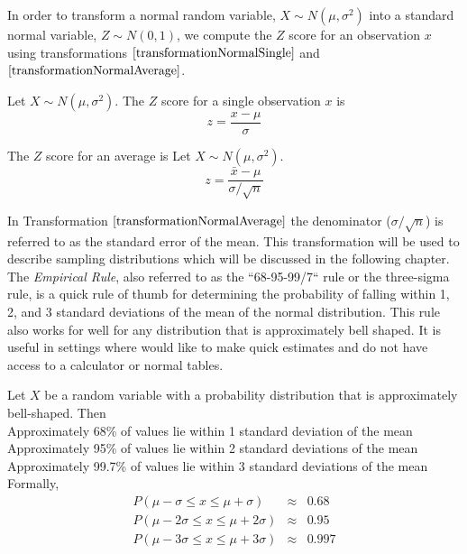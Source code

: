 \noindent
In order to transform a normal random variable, $X \sim N(\mu,\sigma^2)$ 
into a standard normal variable, $Z \sim N(0,1)$, 
we compute the $Z$ score for an observation $x$ using transformations $\ref{transformationNormalSingle}$ and $\ref{transformationNormalAverage}$.

\begin{transformation}
\label{transformationNormalSingle}
Let $X \sim N(\mu, \sigma^{2})$.
The $Z$ score for a single observation $x$ is
	\begin{equation}
	z = \frac{x - \mu}{\sigma}
	\end{equation}
\end{transformation}

\begin{transformation}
\label{transformationNormalAverage}
The $Z$ score for an average is
Let $X \sim N(\mu, \sigma^{2})$.
	\begin{equation}
	z = \frac{ \bar{x} - \mu}{\sigma/\sqrt{n}}
	\end{equation}
\end{transformation}



In Transformation $\ref{transformationNormalAverage}$ 
the denominator ($\sigma/\sqrt{n}$) is referred to as the standard error of the mean. This transformation will be used to describe sampling distributions which will be discussed in the following chapter.\\

The \textit{Empirical Rule}, also referred to as the ``68-95-99/7`` rule or the three-sigma rule, is a quick rule of thumb for 
determining the probability of falling within 1, 2, and 3 standard deviations of the mean of the normal distribution. This rule also works for well for any distribution that is approximately bell shaped. It is useful in settings where would like to make quick estimates and do not have access to a calculator or normal tables.

\begin{rules}	
Let $X$ be a random variable with a probability distribution that is approximately bell-shaped. Then\\

\indent
\quad	Approximately 68\% of values lie within 1 standard deviation of the mean\\[0.25em]
\indent
\quad	Approximately 95\% of values lie within 2 standard deviations of the mean\\[0.25em]
\indent
\quad	Approximately 99.7\% of values lie within 3 standard deviations of the mean\\

Formally,
\begin{eqnarray}
P (\mu - \sigma \leq x \leq \mu + \sigma)		& \approx & 0.68	\\
P (\mu - 2 \sigma \leq x \leq \mu + 2 \sigma)	& \approx & 0.95	\\
P (\mu - 3 \sigma \leq x \leq \mu + 3 \sigma)	& \approx & 0.997
\end{eqnarray}
\end{rules}



